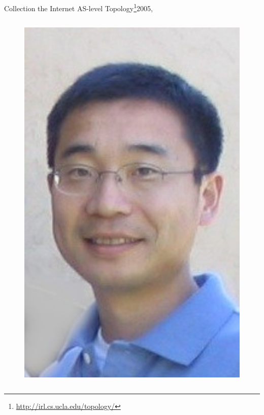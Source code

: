 \documentclass[ngerman,compress,hyperref={bookmarks}]{beamer}
\begin{document}
\begin{frame}{Collection the Internet AS-level Topology\footnote{\url{http://irl.cs.ucla.edu/topology/}}}{2005, \cite{Zhang:2005:CIA:1052812.1052825}}
\begin{columns}[c]
\begin{column}{0.08\textwidth}
\begin{figure}
        \includegraphics[width=1\textwidth]{images/zhang_b}\\

\end{figure}
\end{column}
\end{columns}
\end{frame}
\end{document}
